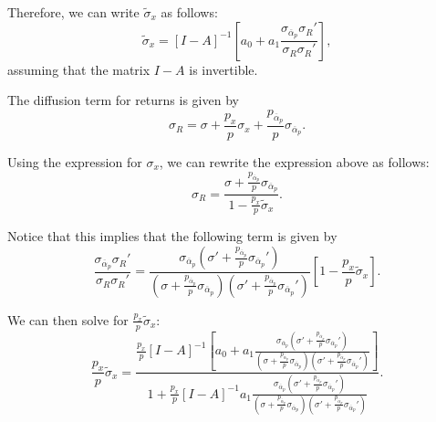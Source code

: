 Therefore, we can write $\widetilde{\sigma}_x$ as follows:
\begin{equation}
    \widetilde{\sigma}_{x} = [I-A]^{-1} \left[ a_{0} + a_1 \frac{\sigma_{\overline{\alpha}_p} \sigma_{R}'}{\sigma_{R}\sigma_{R}'} \right],
\end{equation}
assuming that the matrix $I-A$ is invertible.

The diffusion term for returns is given by
\begin{equation}
\sigma_R = \sigma + \frac{p_x}{p} \sigma_x + \frac{p_{\overline{\alpha}_p}}{p} \sigma_{\overline{\alpha}_p}.
\end{equation}

Using the expression for $\sigma_{x}$, we can rewrite the expression above as follows:
\begin{equation}
    \sigma_{R} = \frac{\sigma + \frac{p_{\overline{\alpha}_p}}{p} \sigma_{\overline{\alpha}_p}}{1-\frac{p_x}{p} \widetilde{\sigma}_x}. 
\end{equation}

Notice that this implies that the following term is given by
\begin{equation}
    \frac{\sigma_{\overline{\alpha}_p} \sigma_{R}'}{\sigma_{R}\sigma_{R}'} = 
    \frac{\sigma_{\overline{\alpha}_p}\left(\sigma' + \frac{p_{\overline{\alpha}_p}}{p} \sigma_{\overline{\alpha}_p}'\right)}{\left(\sigma + \frac{p_{\overline{\alpha}_p}}{p} \sigma_{\overline{\alpha}_p}\right)\left(\sigma' + \frac{p_{\overline{\alpha}_p}}{p} \sigma_{\overline{\alpha}_p}'\right)} \left[ 1-\frac{p_x}{p} \widetilde{\sigma}_x \right].
\end{equation}

We can then solve for $\frac{p_x}{p} \widetilde{\sigma}_x$:
\begin{equation}
    \frac{p_x}{p} \widetilde{\sigma}_x = \frac{\frac{p_x}{p} [I-A]^{-1} \left[a_0+a_1 \frac{\sigma_{\overline{\alpha}_p}\left(\sigma' + \frac{p_{\overline{\alpha}_p}}{p} \sigma_{\overline{\alpha}_p}'\right)}{\left(\sigma + \frac{p_{\overline{\alpha}_p}}{p} \sigma_{\overline{\alpha}_p}\right)\left(\sigma' + \frac{p_{\overline{\alpha}_p}}{p} \sigma_{\overline{\alpha}_p}'\right)}\right]}{1+\frac{p_x}{p} [I-A]^{-1} a_1 \frac{\sigma_{\overline{\alpha}_p}\left(\sigma' + \frac{p_{\overline{\alpha}_p}}{p} \sigma_{\overline{\alpha}_p}'\right)}{\left(\sigma + \frac{p_{\overline{\alpha}_p}}{p} \sigma_{\overline{\alpha}_p}\right)\left(\sigma' + \frac{p_{\overline{\alpha}_p}}{p} \sigma_{\overline{\alpha}_p}'\right)} }.
\end{equation}

